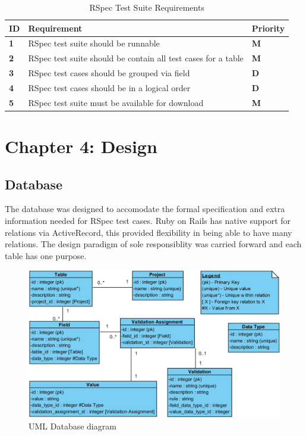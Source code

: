 \documentclass[a4paper,12pt]{article}
\begin{document}
\begin{table}
\centering
\caption{RSpec Test Suite Requirements}
\label{my-label}
\begin{tabular}{|l|l|l|}
\hline
\textbf{ID} & \textbf{Requirement}                                          & \textbf{Priority} \\ \hline
\textbf{1}  & RSpec test suite should be runnable                           & \textbf{M}        \\ \hline
\textbf{2}  & RSpec test suite should be contain all test cases for a table & \textbf{M}        \\ \hline
\textbf{3}  & RSpec test cases should be grouped via field                  & \textbf{D}        \\ \hline
\textbf{4}  & RSpec test cases should be in a logical order                 & \textbf{D}        \\ \hline
\textbf{5}  & RSpec test suite must be available for download               & \textbf{M}        \\ \hline
\end{tabular}
\end{table}

\newpage
\section{Chapter 4: Design}

\subsection{Database}
\par The database was designed to accomodate the formal specification and extra information needed for RSpec test cases. Ruby on Rails has native support for relations via ActiveRecord, this provided flexibility in being able to have many relations. The design paradigm of sole responsiblity was carried forward and each table has one purpose.

\begin{figure}
\includegraphics[width=\linewidth]{screenshots/databaseUML}
\caption{UML Database diagram}
\label{fig:UML1}
\end{figure}
\end{document}
